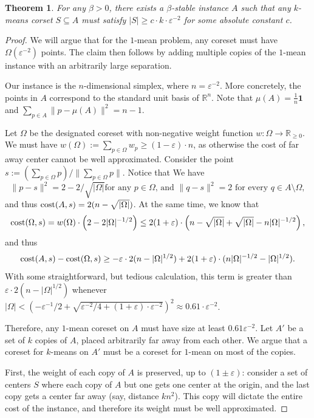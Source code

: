\documentclass[11pt]{article}
\newtheorem{theorem}{Theorem}
\theoremstyle{restate}
\theoremstyle{definition}
\newcommand{\eps}{\ensuremath{\varepsilon}}
\newcommand{\cost}{\textnormal{cost}}
\begin{document}
\begin{theorem}\label{thm: lower-bound}
For any $\beta>0$, there exists a $\beta$-stable instance $A$ such that any $k$-means corset $S\subseteq A$ must satisfy $|S|\geq c\cdot k\cdot \varepsilon^{-2}$ for some absolute constant $c$.
\end{theorem}
\begin{proof}
We will argue that for the $1$-mean problem, any coreset must have $\Omega(\varepsilon^{-2})$ points. The claim then follows by adding multiple copies of the $1$-mean instance with an arbitrarily large separation.

 Our instance is the $n$-dimensional simplex, where $n=\varepsilon^{-2}$. More concretely, the points in $A$ correspond to the standard unit basis of $\mathbb{R}^{n}.$
Note that $\mu(A) = \frac{1}{n}\mathbf{1}$ and $\sum_{p\in A} \|p-\mu(A)\|^2 = n-1$.

Let $\Omega$ be the designated coreset with non-negative weight function $w:\Omega\rightarrow \mathbb{R}_{\geq 0}$.
We must have $w(\Omega):=\sum_{p\in \Omega} w_p\geq (1-\varepsilon)\cdot n$, as otherwise the cost of far away center cannot be well approximated.
Consider the point $s:=(\sum_{p\in \Omega}p)/\|\sum_{p\in \Omega}p\|$. Notice that 
We have 
\[\|p-s\|^2 = 2-2/\sqrt{|\Omega|} \text{for any $p\in \Omega$, and }  \|q-s\|^2 = 2
\text{ for every } q\in A\setminus \Omega,
\]
and thus  $\cost(A,s) = 2(n-\sqrt{|\Omega|})$.
At the same time, we know that 
\[\cost(\Omega,s) = w(\Omega)\cdot \left(2-2|\Omega|^{-1/2}\right)\leq 2(1+\varepsilon)\cdot\left(n-\sqrt{|\Omega|} + \sqrt{|\Omega|}-n|\Omega|^{-1/2}\right),\]
and thus
\[\cost(A,s)-\cost(\Omega,s)\geq -\varepsilon\cdot 2(n-|\Omega|^{1/2}) + 2(1+\varepsilon)\cdot (n|\Omega|^{-1/2}-|\Omega|^{1/2}).\]
With some straightforward, but tedious calculation, this term is greater than $\varepsilon\cdot 2(n-|\Omega|^{1/2})$ whenever
$|\Omega|<\left(-\varepsilon^{-1}/2 + \sqrt{\varepsilon^{-2}/4+(1+\varepsilon)\cdot \varepsilon^{-2}}\right)^2\approx 0.61\cdot  \varepsilon^{-2}$.

Therefore, any $1$-mean coreset on $A$ must have size at least $0.61\eps^{-2}$. Let $A'$ be a set of $k$ copies of $A$, placed arbitrarily far away from each other. We argue that a coreset for $k$-means on $A'$ must be a coreset for $1$-mean on most of the copies. 

First, the weight of each copy of $A$ is preserved, up to $(1\pm \eps)$: consider a set of centers $S$ where each copy of $A$ but one gets one center at the origin, and the last copy gets a center far away (say, distance $kn^2$). This copy will dictate the entire cost of the instance, and therefore its weight must be well approximated.


\end{proof}
\end{document}
